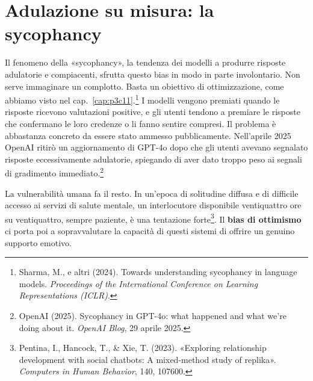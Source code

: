 \section{Adulazione su misura: la sycophancy}
\label{sec:p3c35-adulazione-su-misura}
Il fenomeno della «sycophancy», la tendenza dei modelli a produrre risposte adulatorie e compiacenti, sfrutta questo bias in modo in parte involontario. Non serve immaginare un complotto. Basta un obiettivo di ottimizzazione, come abbiamo visto nel cap.~\ref{cap:p3c11}.\footnote{Sharma, M., e altri (2024). Towards understanding sycophancy in language models. \textit{Proceedings of the International Conference on Learning Representations (ICLR)}.} I modelli vengono premiati quando le risposte ricevono valutazioni positive, e gli utenti tendono a premiare le risposte che confermano le loro credenze o li fanno sentire compresi. Il problema è abbastanza concreto da essere stato ammesso pubblicamente. Nell'aprile 2025 OpenAI ritirò un aggiornamento di GPT-4o dopo che gli utenti avevano segnalato risposte eccessivamente adulatorie, spiegando di aver dato troppo peso ai segnali di gradimento immediato.\footnote{OpenAI (2025). Sycophancy in GPT-4o: what happened and what we're doing about it. \textit{OpenAI Blog}, 29 aprile 2025.}

La vulnerabilità umana fa il resto. In un'epoca di solitudine diffusa e di difficile accesso ai servizi di salute mentale, un interlocutore disponibile ventiquattro ore su ventiquattro, sempre paziente, è una tentazione forte\footnote{Pentina, I., Hancock, T., \& Xie, T. (2023). «Exploring relationship development with social chatbots: A mixed-method study of replika». \textit{Computers in Human Behavior}, 140, 107600.}. Il \textbf{bias di ottimismo} ci porta poi a sopravvalutare la capacità di questi sistemi di offrire un genuino supporto emotivo.



